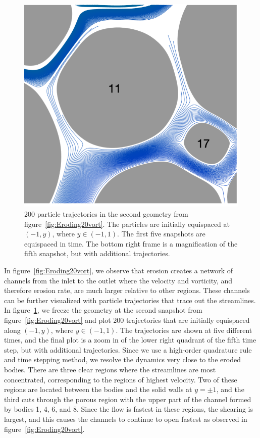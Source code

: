 \documentclass{jfm}
\begin{document}
\begin{figure}
\begin{center}
\includegraphics[width = 0.32 \textwidth]{./figs/tracer_20b270n_zoom}
\caption{\label{fig:Eroding20tracer} 200 particle trajectories in the
second geometry from figure~\ref{fig:Eroding20vort}. The particles are
initially equispaced at $(-1,y)$, where $y \in (-1,1)$. The first five
snapshots are equispaced in time.  The bottom right frame is a
magnification of the fifth snapshot, but with additional trajectories.}
\end{center}
\end{figure}

In figure~\ref{fig:Eroding20vort}, we observe that erosion creates a
network of channels from the inlet to the outlet where the velocity and
vorticity, and therefore erosion rate, are much larger relative to other
regions.  These channels can be further visualized with particle
trajectories that trace out the streamlines.  In
figure~\ref{fig:Eroding20tracer}, we freeze the geometry at the second
snapshot from figure~\ref{fig:Eroding20vort} and plot 200 trajectories
that are initially equispaced along $(-1,y)$, where $y \in (-1,1)$.  The
trajectories are shown at five different times, and the final plot is a
zoom in of the lower right quadrant of the fifth time step, but with
additional trajectories.  Since we use a high-order quadrature rule and
time stepping method, we resolve the dynamics very close to the eroded
bodies.  There are three clear regions where the streamlines are most
concentrated, corresponding to the regions of highest velocity.  Two of
these regions are located between the bodies and the solid walls at
$y=\pm 1$, and the third cuts through the porous region with the upper
part of the channel formed by bodies 1, 4, 6, and 8.  Since the flow is
fastest in these regions, the shearing is largest, and this causes the
channels to continue to open fastest as observed in
figure~\ref{fig:Eroding20vort}.
\end{document}

